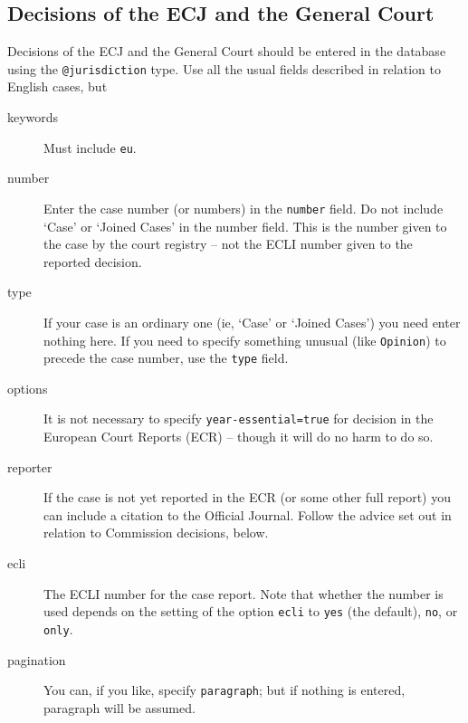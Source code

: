 \documentclass[a4paper,
               11pt,
	       DIV=1,			   
	       footinclude=false]
	      {scrartcl}
\begin{document}
\subsection{Decisions of the ECJ and the General Court}
Decisions of the ECJ and the General Court should be entered in the
database using the \texttt{@jurisdiction} type. Use all the usual
fields described in relation to English cases, but
\begin{description}
\item[keywords] Must include \texttt{eu}.
\item[number]
  Enter the case number (or numbers) in the
  \texttt{number} field. Do not include `Case' or `Joined Cases' in the number field. This
  is the number given to the case by the court registry -- not the ECLI number given
  to the reported decision.
\item[type] If your case is an ordinary one (ie, `Case' or `Joined
  Cases') you need enter nothing here. If you need to specify
  something unusual (like \texttt{Opinion}) to precede the case
  number, use the \texttt{type} field.
\item[options] It is not necessary to specify
  \texttt{year-essential=true} for decision in the European Court
  Reports (ECR) -- though it will do no harm to do so.
\item[reporter] If the case is not yet reported in the ECR (or
  some other full report) you can include a citation to the Official
  Journal. Follow the advice set out in relation to Commission
  decisions, below.
\item[ecli]
  The ECLI number for the case report. Note that whether the
  number is used depends on the setting of the option \verb|ecli| to
  \verb|yes| (the default), \verb|no|, or \verb|only|.
\item[pagination] You can, if you like, specify \texttt{paragraph};
  but if nothing is entered, paragraph will be assumed.
\end{description}
\end{document}
